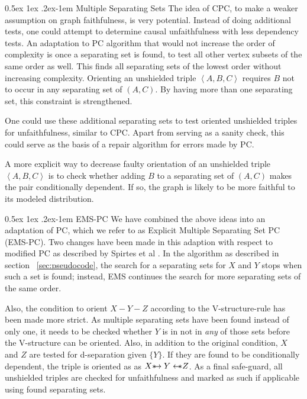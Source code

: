 \documentclass[a4paper, 10pt, english, onecolumn]{article}
\makeatletter
\def \srightarrow {\text{\textasteriskcentered}\hspace{-0.62em}\rightarrow}
\def \sleftarrow {\leftarrow\hspace{-0.62em}\text{\textasteriskcentered}}
\renewcommand{\paragraph}{%
  \@startsection{paragraph}{4}%
  {\z@}{0.5ex \@plus 1ex \@minus .2ex}{-1em}%
  {\normalfont\normalsize\bfseries}%
}
\makeatother
\begin{document}
\paragraph{Multiple Separating Sets}
The idea of CPC, to make a weaker assumption on graph faithfulness, is very potential.
Instead of doing additional tests, one could attempt to determine causal unfaithfulness with less dependency tests.
An adaptation to PC algorithm that would not increase the order of complexity is once a separating set is found, to test all other vertex subsets of the same order as well.
This finds all separating sets of the lowest order without increasing complexity.
Orienting an unshielded triple $\left<A,B,C\right>$ requires $B$ not to occur in any separating set of $(A,C)$.
By having more than one separating set, this constraint is strengthened.

One could use these additional separating sets to test oriented unshielded triples for unfaithfulness, similar to CPC.
Apart from serving as a sanity check, this could serve as the basis of a repair algorithm for errors made by PC.

A more explicit way to decrease faulty orientation of an unshielded triple $\left<A,B,C\right>$ is to check whether adding $B$ to a separating set of $(A,C)$ makes the pair conditionally dependent.
If so, the graph is likely to be more faithful to its modeled distribution.

\paragraph{EMS-PC}
We have combined the above ideas into an adaptation of PC, which we refer to as Explicit Multiple Separating Set PC (EMS-PC).
Two changes have been made in this adaption with respect to modified PC as described by Spirtes et al \cite{spirtes2000}.
In the algorithm as described in section ~\ref{sec:pseudocode}, the search for a separating sets for $X$ and $Y$ stops when such a set is found; instead, EMS continues the search for more separating sets of the same order.

Also, the condition to orient $X - Y - Z$ according to the V-structure-rule has been made more strict.
As multiple separating sets have been found instead of only one, it needs to be checked whether $Y$ is in not in \emph{any} of those sets before the V-structure can be oriented.
Also, in addition to the original condition, $X$ and $Z$ are tested for d-separation given $\{Y\}$.
If they are found to be conditionally dependent, the triple is oriented as as $X \srightarrow Y \sleftarrow Z$.
As a final safe-guard, all unshielded triples are checked for unfaithfulness and marked as such if applicable using found separating sets. %
\end{document}
